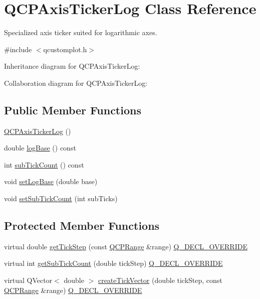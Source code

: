 \hypertarget{class_q_c_p_axis_ticker_log}{}\section{Q\+C\+P\+Axis\+Ticker\+Log Class Reference}
\label{class_q_c_p_axis_ticker_log}


Specialized axis ticker suited for logarithmic axes.  




{\ttfamily \#include $<$qcustomplot.\+h$>$}



Inheritance diagram for Q\+C\+P\+Axis\+Ticker\+Log\+:


Collaboration diagram for Q\+C\+P\+Axis\+Ticker\+Log\+:
\subsection*{Public Member Functions}
\begin{DoxyCompactItemize}
\item 
\hyperlink{class_q_c_p_axis_ticker_log_af3cb86ea5eef2023c0b96b5260c4cbdf}{Q\+C\+P\+Axis\+Ticker\+Log} ()
\item 
double \hyperlink{class_q_c_p_axis_ticker_log_a841a97f2b6850ff1ef3aa73e89d94775}{log\+Base} () const
\item 
int \hyperlink{class_q_c_p_axis_ticker_log_aebe43661977364fc1fd220fa1ae36a10}{sub\+Tick\+Count} () const
\item 
void \hyperlink{class_q_c_p_axis_ticker_log_ac6e3b4e03baea3816f898869ab9751ef}{set\+Log\+Base} (double base)
\item 
void \hyperlink{class_q_c_p_axis_ticker_log_ad51989c798c0cfd50936d77aac57c56a}{set\+Sub\+Tick\+Count} (int sub\+Ticks)
\end{DoxyCompactItemize}
\subsection*{Protected Member Functions}
\begin{DoxyCompactItemize}
\item 
virtual double \hyperlink{class_q_c_p_axis_ticker_log_a57be974214a065d3247406331f02fa49}{get\+Tick\+Step} (const \hyperlink{class_q_c_p_range}{Q\+C\+P\+Range} \&range) \hyperlink{qcustomplot_8h_a42cc5eaeb25b85f8b52d2a4b94c56f55}{Q\+\_\+\+D\+E\+C\+L\+\_\+\+O\+V\+E\+R\+R\+I\+DE}
\item 
virtual int \hyperlink{class_q_c_p_axis_ticker_log_a352fef7ae68837acd26e35188aa86167}{get\+Sub\+Tick\+Count} (double tick\+Step) \hyperlink{qcustomplot_8h_a42cc5eaeb25b85f8b52d2a4b94c56f55}{Q\+\_\+\+D\+E\+C\+L\+\_\+\+O\+V\+E\+R\+R\+I\+DE}
\item 
virtual Q\+Vector$<$ double $>$ \hyperlink{class_q_c_p_axis_ticker_log_af8873a8d1d2b9392d8f7a73218c889ab}{create\+Tick\+Vector} (double tick\+Step, const \hyperlink{class_q_c_p_range}{Q\+C\+P\+Range} \&range) \hyperlink{qcustomplot_8h_a42cc5eaeb25b85f8b52d2a4b94c56f55}{Q\+\_\+\+D\+E\+C\+L\+\_\+\+O\+V\+E\+R\+R\+I\+DE}
\end{DoxyCompactItemize}
